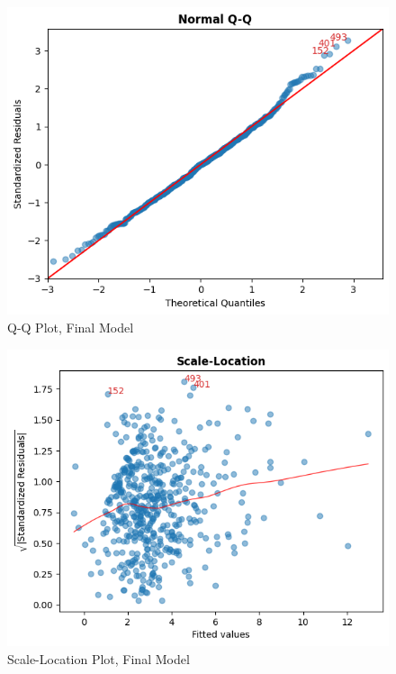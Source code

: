\documentclass[10pt]{article}
\begin{document}
\begin{figure}[H]
\centering
	\centerline{\includegraphics[width=\columnwidth]{final_qq}}
	\caption{Q-Q Plot, Final Model\label{final_qq}}
\end{figure}

\begin{figure}[H]
\centering
	\centerline{\includegraphics[width=\columnwidth]{final_scale_location}}
	\caption{Scale-Location Plot, Final Model\label{final_scale_location}}
\end{figure}
\end{document}
